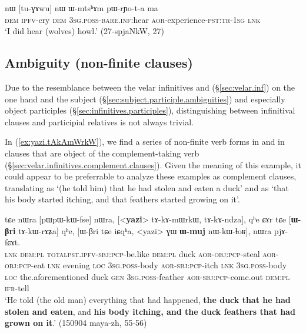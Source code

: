 \begin{exe}
\ex \label{ex:tuGAwu.nW.WmtshAm}
\gll nɯ [tu-ɣɤwu] nɯ ɯ-mtsʰɤm pɯ-rɲo-t-a ma  \\
\textsc{dem} \textsc{ipfv}-cry \textsc{dem} \textsc{3sg}.\textsc{poss}-\textsc{bare}.\textsc{inf}:hear \textsc{aor}-experience-\textsc{pst}:\textsc{tr}-\textsc{1sg} \textsc{lnk} \\
\glt `I did hear (wolves) howl.' (27-spjaNkW, 27)
\end{exe}

\subsection{Ambiguity (non-finite clauses)} \label{sec:non-finite.relative.complement.ambiguity}
Due to the resemblance between the velar infinitives  and  (§\ref{sec:velar.inf}) on the one hand and the subject (§\ref{sec:subject.participle.ambiguities}) and especially object participles (§\ref{sec:infinitives.participles}), distinguishing between infinitival clauses and participial relatives is not always trivial.

In (\ref{ex:yazi.tAkAmWrkW}), we find a series of non-finite verb forms in  and  in clauses that are object of the complement-taking verb  (§\ref{sec:velar.infinitives.complement.clauses}). Given the meaning of this example, it could appear to be preferrable to analyze these examples as complement clauses, translating  as `(he told him) that he had stolen and eaten a duck' and  as `that his body started itching, and that feathers started growing on it'. 

\begin{exe}
\ex \label{ex:yazi.tAkAmWrkW}
\gll tɕe nɯra [pɯ\redp{}pɯ-kɯ-fse] nɯra, [<\textbf{yazi}> tɤ-kɤ-mɯrkɯ, tɤ-kɤ-ndza], qʰe ɕɤr tɕe [\textbf{ɯ-βri} tɤ-kɯ-rɤʑa] qʰe, [ɯ-βri tɕe iɕqʰa, <yazi> ɣɯ \textbf{ɯ-muj} nɯ-kɯ-ɬoʁ], nɯra pjɤ-fɕɤt. \\
\textsc{lnk} \textsc{dem}:\textsc{pl} \textsc{total}\redp{}\textsc{pst}.\textsc{ipfv}-\textsc{sbj}:\textsc{pcp}-be.like \textsc{dem}:\textsc{pl}  duck \textsc{aor}-\textsc{obj}:\textsc{pcp}-steal \textsc{aor}-\textsc{obj}:\textsc{pcp}-eat \textsc{lnk} evening \textsc{loc} \textsc{3sg}.\textsc{poss}-body \textsc{aor}-\textsc{sbj}:\textsc{pcp}-itch \textsc{lnk}   \textsc{3sg}.\textsc{poss}-body \textsc{loc} the.aforementioned duck \textsc{gen} \textsc{3sg}.\textsc{poss}-feather \textsc{aor}-\textsc{sbj}:\textsc{pcp}-come.out \textsc{dem}:\textsc{pl} \textsc{ifr}-tell \\
\glt `He told (the old man) everything that had happened, \textbf{the duck that he had stolen and eaten}, and \textbf{his body itching, and the duck feathers that had grown on it}.' (150904 maya-zh, 55-56)
 \end{exe}

